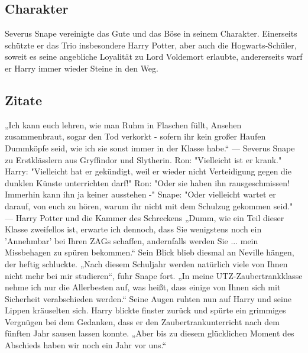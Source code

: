 \documentclass[a4paper, 10pt]{article}
\begin{document}
\subsection*{\Large Charakter}
Severus Snape vereinigte das Gute und das Böse in seinem Charakter. Einerseits schützte er das Trio insbesondere Harry Potter, aber auch die Hogwarts-Schüler, soweit es seine angebliche Loyalität zu Lord Voldemort erlaubte, andererseits warf er Harry immer wieder Steine in den Weg.

\subsection*{\Large Zitate}
„Ich kann euch lehren, wie man Ruhm in Flaschen füllt, Ansehen zusammenbraut, sogar den Tod verkorkt - sofern ihr kein großer Haufen Dummköpfe seid, wie ich sie sonst immer in der Klasse habe.“
\vspace{10pt}
\newline
{}  
— Severus Snape zu Erstklässlern aus Gryffindor und Slytherin.
\vspace{10pt}
\newline
{}  
Ron: "Vielleicht ist er krank."
\vspace{10pt}
\newline
{}  
Harry: "Vielleicht hat er gekündigt, weil er wieder nicht Verteidigung gegen die dunklen Künste unterrichten darf!"
\vspace{10pt}
\newline
{}  
Ron: "Oder sie haben ihn rausgeschmissen! Immerhin kann ihn ja keiner ausstehen -"
\vspace{10pt}
\newline
{}  
Snape: "Oder vielleicht wartet er darauf, von euch zu hören, warum ihr nicht mit dem Schulzug gekommen seid."
\vspace{10pt}
\newline
{}  
— Harry Potter und die Kammer des Schreckens
\vspace{10pt}
\newline
{}  
„Dumm, wie ein Teil dieser Klasse zweifellos ist, erwarte ich dennoch, dass Sie wenigstens noch ein 'Annehmbar' bei Ihren ZAGs schaffen, andernfalls werden Sie ... mein Missbehagen zu spüren bekommen.“ Sein Blick blieb diesmal an Neville hängen, der heftig schluckte. „Nach diesem Schuljahr werden natürlich viele von Ihnen nicht mehr bei mir studieren“, fuhr Snape fort. „In meine UTZ-Zaubertrankklasse nehme ich nur die Allerbesten auf, was heißt, dass einige von Ihnen sich mit Sicherheit verabschieden werden.“ Seine Augen ruhten nun auf Harry und seine Lippen kräuselten sich. Harry blickte finster zurück und spürte ein grimmiges Vergnügen bei dem Gedanken, dass er den Zaubertrankunterricht nach dem fünften Jahr sausen lassen konnte. „Aber bis zu diesem glücklichen Moment des Abschieds haben wir noch ein Jahr vor uns.“
\end{document}
